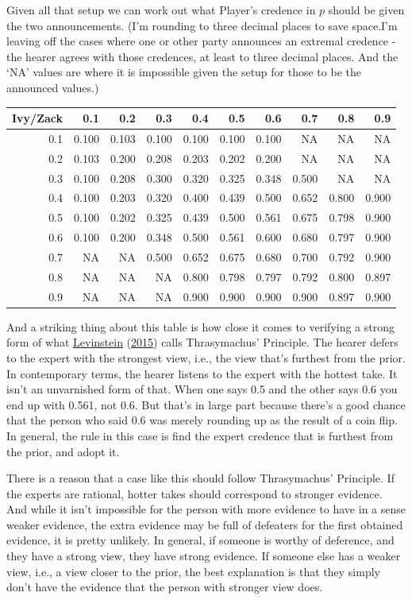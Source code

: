 \documentclass[
  12pt,
]{article}
\begin{document}
Given all that setup we can work out what Player's credence in \(p\)
should be given the two announcements. (I'm rounding to three decimal
places to save space.I'm leaving off the cases where one or other party
announces an extremal credence - the hearer agrees with those credences,
at least to three decimal places. And the `NA' values are where it is
impossible given the setup for those to be the announced values.)

\begin{tabular}{rrrrrrrrrr}
\toprule
Ivy/Zack & 0.1 & 0.2 & 0.3 & 0.4 & 0.5 & 0.6 & 0.7 & 0.8 & 0.9\\
\midrule
0.1 & 0.100 & 0.103 & 0.100 & 0.100 & 0.100 & 0.100 & NA & NA & NA\\
0.2 & 0.103 & 0.200 & 0.208 & 0.203 & 0.202 & 0.200 & NA & NA & NA\\
0.3 & 0.100 & 0.208 & 0.300 & 0.320 & 0.325 & 0.348 & 0.500 & NA & NA\\
0.4 & 0.100 & 0.203 & 0.320 & 0.400 & 0.439 & 0.500 & 0.652 & 0.800 & 0.900\\
0.5 & 0.100 & 0.202 & 0.325 & 0.439 & 0.500 & 0.561 & 0.675 & 0.798 & 0.900\\
0.6 & 0.100 & 0.200 & 0.348 & 0.500 & 0.561 & 0.600 & 0.680 & 0.797 & 0.900\\
0.7 & NA & NA & 0.500 & 0.652 & 0.675 & 0.680 & 0.700 & 0.792 & 0.900\\
0.8 & NA & NA & NA & 0.800 & 0.798 & 0.797 & 0.792 & 0.800 & 0.897\\
0.9 & NA & NA & NA & 0.900 & 0.900 & 0.900 & 0.900 & 0.897 & 0.900\\
\bottomrule
\end{tabular}

And a striking thing about this table is how close it comes to verifying
a strong form of what \protect\hyperlink{ref-Levinstein2015}{Levinstein}
(\protect\hyperlink{ref-Levinstein2015}{2015}) calls Thrasymachus'
Principle. The hearer defers to the expert with the strongest view,
i.e., the view that's furthest from the prior. In contemporary terms,
the hearer listens to the expert with the hottest take. It isn't an
unvarnished form of that. When one says 0.5 and the other says 0.6 you
end up with 0.561, not 0.6. But that's in large part because there's a
good chance that the person who said 0.6 was merely rounding up as the
result of a coin flip. In general, the rule in this case is find the
expert credence that is furthest from the prior, and adopt it.

There is a reason that a case like this should follow Thrasymachus'
Principle. If the experts are rational, hotter takes should correspond
to stronger evidence. And while it isn't impossible for the person with
more evidence to have in a sense weaker evidence, the extra evidence may
be full of defeaters for the first obtained evidence, it is pretty
unlikely. In general, if someone is worthy of deference, and they have a
strong view, they have strong evidence. If someone else has a weaker
view, i.e., a view closer to the prior, the best explanation is that
they simply don't have the evidence that the person with stronger view
does.
\end{document}
